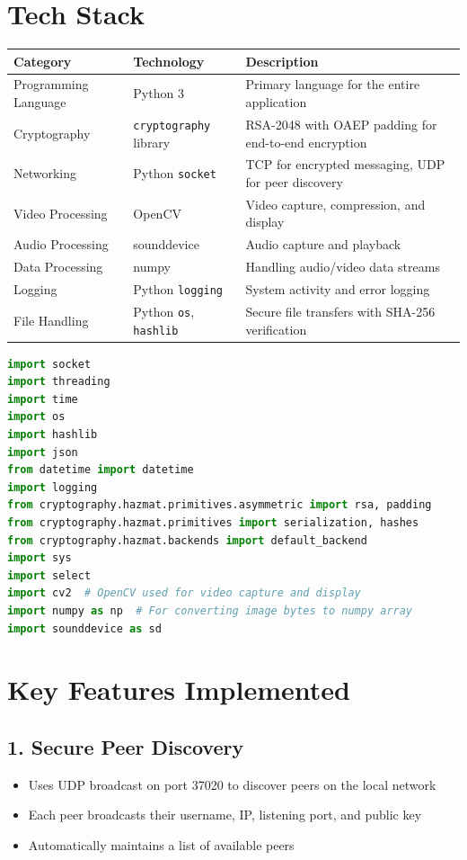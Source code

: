 \documentclass{article}
\begin{document}
\newpage
\section*{Tech Stack}
\begin{table}[h]
\centering
\label{tab:techstack}
\begin{tabular}{|l|l|p{8cm}|}
\hline
\textbf{Category} & \textbf{Technology} & \textbf{Description} \\ \hline
Programming Language & Python 3 & Primary language for the entire application \\ \hline
Cryptography & \texttt{cryptography} library & RSA-2048 with OAEP padding for end-to-end encryption \\ \hline
Networking & Python \texttt{socket} & TCP for encrypted messaging, UDP for peer discovery \\ \hline
Video Processing & OpenCV & Video capture, compression, and display \\ \hline
Audio Processing & sounddevice & Audio capture and playback \\ \hline
Data Processing & numpy & Handling audio/video data streams \\ \hline
Logging & Python \texttt{logging} & System activity and error logging \\ \hline
File Handling & Python \texttt{os}, \texttt{hashlib} & Secure file transfers with SHA-256 verification \\ \hline
\end{tabular}
\end{table}

\begin{lstlisting}[language=Python]
import socket
import threading
import time
import os
import hashlib
import json
from datetime import datetime
import logging
from cryptography.hazmat.primitives.asymmetric import rsa, padding
from cryptography.hazmat.primitives import serialization, hashes
from cryptography.hazmat.backends import default_backend
import sys
import select
import cv2  # OpenCV used for video capture and display
import numpy as np  # For converting image bytes to numpy array
import sounddevice as sd
\end{lstlisting}

\section*{Key Features Implemented}
\subsection*{1. Secure Peer Discovery}
\begin{itemize}
    \item Uses UDP broadcast on port 37020 to discover peers on the local network
    \item Each peer broadcasts their username, IP, listening port, and public key
    \item Automatically maintains a list of available peers
\end{itemize}
\end{document}
